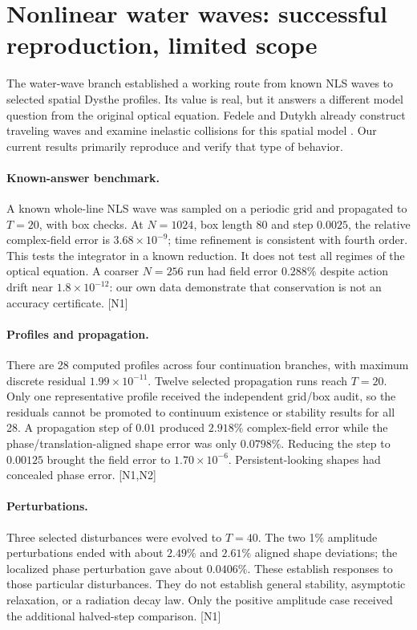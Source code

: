 \documentclass[11pt]{article}
\newcommand{\src}[1]{\textrm{[#1]}}
\begin{document}
\newpage
\section{Nonlinear water waves: successful reproduction, limited scope}
The water-wave branch established a working route from known NLS waves to selected spatial Dysthe profiles. Its value is real, but it answers a different model question from the original optical equation. Fedele and Dutykh already construct traveling waves and examine inelastic collisions for this spatial model \cite{FD}. Our current results primarily reproduce and verify that type of behavior.

\paragraph{Known-answer benchmark.}
A known whole-line NLS wave was sampled on a periodic grid and propagated to $T=20$, with box checks. At $N=1024$, box length $80$ and step $0.0025$, the relative complex-field error is $3.68\times10^{-9}$; time refinement is consistent with fourth order. This tests the integrator in a known reduction. It does not test all regimes of the optical equation. A coarser $N=256$ run had field error $0.288\%$ despite action drift near $1.8\times10^{-12}$: our own data demonstrate that conservation is not an accuracy certificate. \src{N1}

\paragraph{Profiles and propagation.}
There are 28 computed profiles across four continuation branches, with maximum discrete residual $1.99\times10^{-11}$. Twelve selected propagation runs reach $T=20$. Only one representative profile received the independent grid/box audit, so the residuals cannot be promoted to continuum existence or stability results for all 28. A propagation step of $0.01$ produced $2.918\%$ complex-field error while the phase/translation-aligned shape error was only $0.0798\%$. Reducing the step to $0.00125$ brought the field error to $1.70\times10^{-6}$. Persistent-looking shapes had concealed phase error. \src{N1,N2}

\paragraph{Perturbations.}
Three selected disturbances were evolved to $T=40$. The two 1\% amplitude perturbations ended with about $2.49\%$ and $2.61\%$ aligned shape deviations; the localized phase perturbation gave about $0.0406\%$. These establish responses to those particular disturbances. They do not establish general stability, asymptotic relaxation, or a radiation decay law. Only the positive amplitude case received the additional halved-step comparison. \src{N1}
\end{document}
